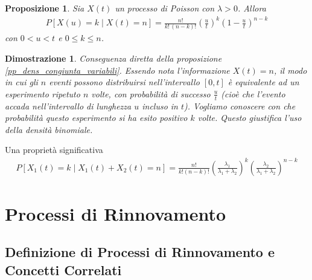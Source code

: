 \documentclass{article}
\newtheorem{proposizione}{Proposizione}[section]
\newtheorem*{dimostrazione*}{Dimostrazione}
\begin{document}
\begin{boxedminipage}{\textwidth}
\begin{proposizione}
\label{pp_prob_condizionata_binomiale}
Sia $X(t)$ un processo di Poisson con $\lambda > 0$. Allora
\begin{gather}
P[X(u) = k \mid X(t) = n] = \frac{n!}{k!\,(n-k)!} \left(\frac{u}{t}\right)^k\left(1-\frac{u}{t}\right)^{n-k}
\end{gather}
con $0<u<t$ e $0\le k \le n$.
\end{proposizione}
\begin{dimostrazione*}
Conseguenza diretta della proposizione \ref{pp_dens_congiunta_variabili}. Essendo nota l'informazione $X(t) = n$, il modo in cui gli $n$ eventi possono distribuirsi nell'intervallo $[0,t]$ è equivalente ad un esperimento ripetuto $n$ volte, con probabilità di successo $\frac{u}{t}$ (cioè che l'evento accada nell'intervallo di lunghezza $u$ incluso in $t$). Vogliamo conoscere con che probabilità questo esperimento si ha esito positivo $k$ volte. Questo giustifica l'uso della densità binomiale. 
\end{dimostrazione*}

Una proprietà significativa
\begin{align}
P[X_1(t) = k \mid X_1(t) + X_2(t) = n] = \frac{n!}{k!(n-k)!}\left(\frac{\lambda_1}{\lambda_1+\lambda_2}\right)^k\left(\frac{\lambda_2}{\lambda_1+\lambda_2}\right)^{n-k}
\end{align}
\end{boxedminipage}



\newpage
\section{Processi di Rinnovamento}

\subsection{Definizione di Processi di Rinnovamento e Concetti Correlati}
\end{document}
